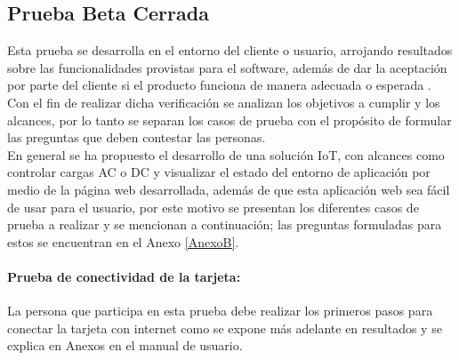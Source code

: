 %
%



\subsection{Prueba Beta Cerrada}

Esta prueba se desarrolla en el entorno del cliente o usuario, arrojando resultados sobre las funcionalidades provistas para el software, además de dar la aceptación por parte del cliente si el producto funciona de manera adecuada o esperada \cite{PB}. Con el fin de realizar dicha verificación se analizan los objetivos a cumplir y los alcances, por lo tanto se separan los casos de prueba con el propósito de formular las preguntas que deben contestar las personas.\\

En general se ha propuesto el desarrollo de una solución IoT, con alcances como controlar cargas AC o DC y visualizar el estado del entorno de aplicación por medio de la página web desarrollada, además de que esta aplicación web sea fácil de usar para el usuario, por este motivo se presentan los diferentes casos de prueba a realizar y se mencionan a continuación; las preguntas formuladas para estos se encuentran en el Anexo \ref{AnexoB}.

\paragraph{Prueba de conectividad de la tarjeta:} La persona que participa en esta prueba debe realizar los primeros pasos para conectar la tarjeta con internet como se expone más adelante en resultados y se explica en Anexos en el manual de usuario.\\

